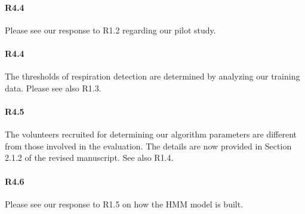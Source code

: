 \paragraph{R4.4} Please see our response to R1.2 regarding our pilot study.
\vspace{-2mm}
\paragraph{R4.4} The thresholds of respiration detection are determined by analyzing our training data. Please
see also R1.3.
\vspace{-2mm}

\paragraph{R4.5} The volunteers recruited for determining our algorithm parameters are different from those involved in the
 evaluation. The details are now provided in Section 2.1.2 of the revised manuscript. See also R1.4.

 \paragraph{R4.6} Please see our response to R1.5 on how the HMM model is built.
